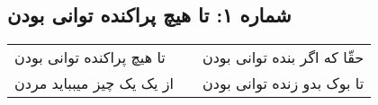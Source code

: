 \begin{center}
\section*{شماره ۱: تا هیچ پراکنده توانی بودن}
\label{sec:001}
\begin{longtable}{l p{0.5cm} r}
تا هیچ پراکنده توانی بودن
&&
حقّا که اگر بنده توانی بودن
\\
از یک یک چیز میبباید مردن
&&
تا بوک بدو زنده توانی بودن
\\
\end{longtable}
\end{center}
